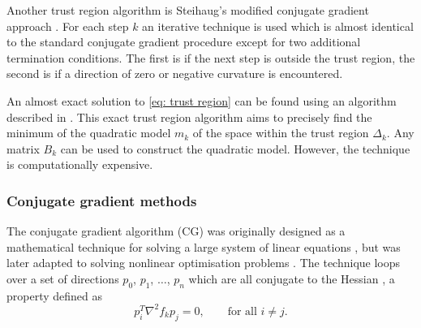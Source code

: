 \begin{htmlonly}
\begin{htmlonly}
Another trust region algorithm is Steihaug's modified conjugate gradient approach \citep{Steihaug83}.  For each step $k$ an iterative technique is used which is almost identical to the standard conjugate gradient procedure except for two additional termination conditions.  The first is if the next step is outside the trust region, the second is if a direction of zero or negative curvature is encountered.

An almost exact solution to \eqref{eq: trust region} can be found using an algorithm described in \citet{NocedalWright99}.  This exact trust region algorithm aims to precisely find the minimum of the quadratic model $m_k$ of the space within the trust region $\Delta_k$.  Any matrix $B_k$ can be used to construct the quadratic model.  However, the technique is computationally expensive.



\subsubsection{Conjugate gradient methods}

The conjugate gradient algorithm (CG) was originally designed as a mathematical technique for solving a large system of linear equations \citet{HestenesStiefel52}, but was later adapted to solving nonlinear optimisation problems \citep{FletcherReeves64}.  The technique loops over a set of directions $p_0$, $p_1$, $\hdots$, $p_n$ which are all conjugate to the Hessian \citep{NocedalWright99}, a property defined as
\begin{equation}
 p_i^T \nabla^2 f_k p_j = 0,  \qquad \textrm{for all } i \ne j.
\end{equation}


\end{htmlonly}
\end{htmlonly}
